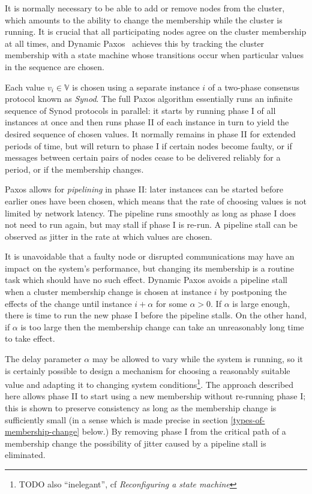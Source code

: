\documentclass[journal]{IEEEtran}
\begin{document}
It is normally necessary to be able to add or remove nodes from the cluster,
which amounts to the ability to change the membership while the cluster is
running. It is crucial that all participating nodes agree on the cluster
membership at all times, and Dynamic Paxos~\cite{cheap-paxos} achieves this by
tracking the cluster membership with a state machine whose transitions occur
when particular values in the sequence are chosen.

Each value $v_i \in \mathbb V$ is chosen using a separate instance $i$ of a
two-phase consensus protocol known as \textit{Synod}. The full Paxos algorithm
essentially runs an infinite sequence of Synod protocols in parallel: it starts
by running phase I of all instances at once and then runs phase II of each
instance in turn to yield the desired sequence of chosen values. It normally
remains in phase II for extended periods of time, but will return to phase I if
certain nodes become faulty, or if messages between certain pairs of nodes
cease to be delivered reliably for a period, or if the membership changes.

Paxos allows for \textit{pipelining} in phase II: later instances can be
started before earlier ones have been chosen, which means that the rate of
choosing values is not limited by network latency. The pipeline runs smoothly
as long as phase I does not need to run again, but may stall if phase I is
re-run. A pipeline stall can be observed as jitter in the rate at which values
are chosen.

It is unavoidable that a faulty node or disrupted communications may have an
impact on the system's performance, but changing its membership is a routine
task which should have no such effect. Dynamic Paxos avoids a pipeline stall
when a cluster membership change is chosen at instance $i$ by postponing the
effects of the change until instance $i + \alpha$ for some $\alpha > 0$. If
$\alpha$ is large enough, there is time to run the new phase I before the
pipeline stalls.  On the other hand, if $\alpha$ is too large then the
membership change can take an unreasonably long time to take effect.

The delay parameter $\alpha$ may be allowed to vary while the system is
running, so it is certainly possible to design a mechanism for choosing a
reasonably suitable value and adapting it to changing system
conditions\footnote{TODO also ``inelegant'', cf \textit{Reconfiguring a state
machine}}. The approach described here allows phase II to start using a new
membership without re-running phase I; this is shown to preserve consistency as
long as the membership change is sufficiently small (in a sense which is made
precise in section \ref{types-of-membership-change} below.) By removing phase I
from the critical path of a membership change the possibility of jitter caused
by a pipeline stall is eliminated.
\end{document}
